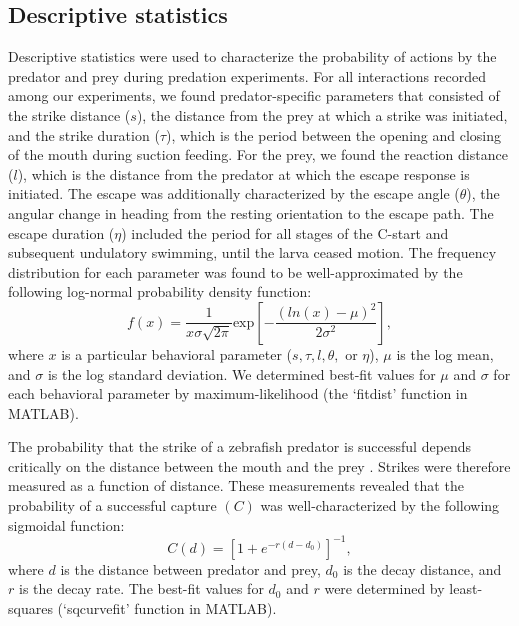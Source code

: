 \documentclass[]{rsos}%
\begin{document}
\subsection{Descriptive statistics}

Descriptive statistics were used to characterize the probability of actions by the predator and prey during predation experiments.
For all interactions recorded among our experiments, we found predator-specific parameters that consisted of the strike distance ($s$), the distance from the prey at which a strike was initiated, and the strike duration ($\tau$), which is the period between the opening and closing of the mouth during suction feeding. 
For the prey, we found the reaction distance ($l$), which is the distance from the predator at which the escape response is initiated.
The escape was additionally characterized by the escape angle ($\theta$), the angular change in heading from the resting orientation to the escape path.
The escape duration ($\eta$) included the period for all stages of the C-start and subsequent undulatory swimming, until the larva ceased motion.
The frequency distribution for each parameter was found to be well-approximated by the following log-normal probability density function:
%
\begin{equation}%
f(x) = \frac{1}{x\sigma \sqrt{2 \pi}} \text{exp} \left[ -{\frac{(ln(x)-\mu)^2}{2\sigma ^2}} \right],
\label{eqn_lognorm}
\end{equation}
%
where $x$ is a particular behavioral parameter ($s, \tau, l, \theta ,$ or $\eta$), $\mu$ is the log mean, and $\sigma$ is the log standard deviation. 
We determined best-fit values for $\mu$ and $\sigma$ for each behavioral parameter by maximum-likelihood (the `fitdist' function in MATLAB).

The probability that the strike of a zebrafish predator is successful depends critically on the distance between the mouth and the prey \cite{Stewart:2013bha}.
Strikes were therefore measured as a function of distance. 
These measurements revealed that the probability of a successful capture $(C)$ was well-characterized by the following sigmoidal function:
%
\begin{equation}%
C(d) = \left[ 1+e^{-r(d-d_0)} \right]^{-1},
\label{eqn_sig} 
\end{equation}
%
where $d$ is the distance between predator and prey, $d_0$ is the decay distance, and $r$ is the decay rate. 
The best-fit values for $d_0$ and $r$ were determined by least-squares (`sqcurvefit' function in MATLAB).
\end{document}
